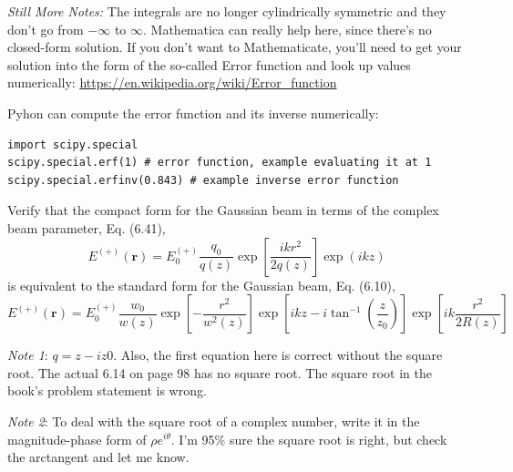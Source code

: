 \documentclass[11pt]{hmcpset}
\begin{document}
\begin{problem}
	\textit{Still More Notes:} The integrals are no longer cylindrically symmetric and they don't go from $-\infty$ to $\infty$. Mathematica can really help here, since there's no closed-form solution. If you don't want to Mathematicate, you'll need to get your solution into the form of the so-called Error function and look up values numerically: \url{https://en.wikipedia.org/wiki/Error_function}
	
	Pyhon can compute the error function and its inverse numerically:
	\begin{lstlisting}[style=Python]
import scipy.special
scipy.special.erf(1) # error function, example evaluating it at 1
scipy.special.erfinv(0.843) # example inverse error function 
	\end{lstlisting}
\end{problem}
\pagebreak






\begin{problem}
	Verify that the compact form for the Gaussian beam in terms of the complex beam parameter,
	Eq. (6.41),
	\[
	E^{(+)}(\mathbf{r}) = E^{(+)}_0 \frac{q_0}{q(z)}
	\exp \left[ \frac{i k r^2}{2q(z)} \right] 
	\exp(ikz)
	\]
	is equivalent to the standard form for the Gaussian beam, Eq. (6.10),
	\[
	E^{(+)}(\mathbf{r}) = E^{(+)}_0 \frac{w_0}{w(z)}
	\exp \left[ - \frac{r^2}{w^2(z)} \right] 
	\exp \left[ikz - i \tan^{-1}\left(\frac{z}{z_0}\right) \right] 
	\exp \left[ i k \frac{r^2}{2R(z)} \right] 
	\]
	
	\textit{Note 1}: $q=z-i z0$. Also, the first equation here is correct without the square root. The actual 6.14 on page 98 has no square root. The square root in the book's problem statement is wrong.
	
	\textit{Note 2}: To deal with the square root of a complex number, write it in the magnitude-phase form of $\rho e^{i\theta}$. I'm 95\% sure the square root is right, but check the arctangent and let me know.
\end{problem}

\begin{solution}
	\vfill
\end{solution}
\pagebreak
\end{document}
